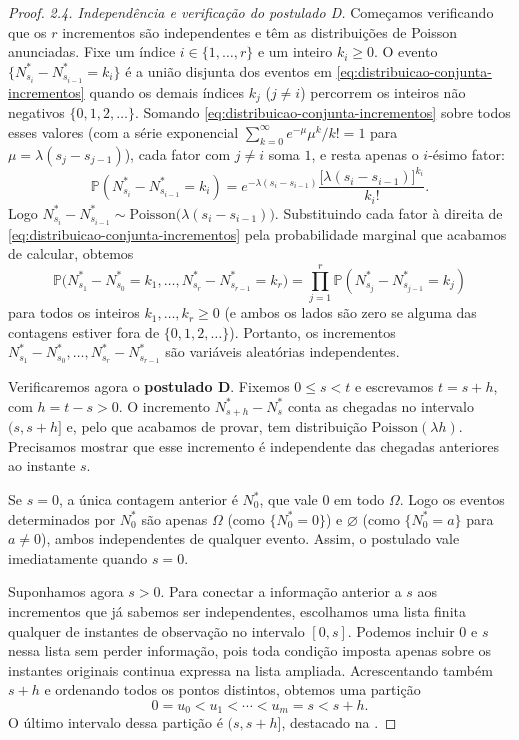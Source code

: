 \documentclass[12pt,portuguese]{article}
\theoremstyle{definition}
\theoremstyle{plainexercise}
\theoremstyle{starredexercise}
\theoremstyle{definition}
\begin{document}
\begin{proof}
\smallskip
\noindent\textit{2.4. Independência e verificação do postulado D.}
Começamos verificando que os $r$ incrementos são independentes e têm as
distribuições de Poisson anunciadas. Fixe um índice $i\in\{1,\ldots,r\}$ e um
inteiro $k_i\geqslant0$. O evento $\{N_{s_i}^*-N_{s_{i-1}}^*=k_i\}$ é a união
disjunta dos eventos em \eqref{eq:distribuicao-conjunta-incrementos} quando os
demais índices $k_j$ ($j\neq i$) percorrem os inteiros não negativos
$\{0,1,2,\ldots\}$. Somando \eqref{eq:distribuicao-conjunta-incrementos} sobre
todos esses valores (com a série exponencial $\sum_{k=0}^\infty e^{-\mu}\mu^k/k!=1$
para $\mu=\lambda(s_j-s_{j-1})$), cada fator com $j\neq i$ soma $1$, e resta
apenas o $i$-ésimo fator:
\[
  \mathbb{P}(N_{s_i}^*-N_{s_{i-1}}^*=k_i)
  =e^{-\lambda(s_i-s_{i-1})}
   \frac{\bigl[\lambda(s_i-s_{i-1})\bigr]^{k_i}}{k_i!}.
\]
Logo $N_{s_i}^*-N_{s_{i-1}}^*\sim\mathrm{Poisson}\bigl(\lambda(s_i-s_{i-1})\bigr)$.
Substituindo cada fator à direita de \eqref{eq:distribuicao-conjunta-incrementos}
pela probabilidade marginal que acabamos de calcular, obtemos
\[
  \mathbb{P}\bigl(N_{s_1}^*-N_{s_0}^*=k_1,\ldots,N_{s_r}^*-N_{s_{r-1}}^*=k_r\bigr)
  =\prod_{j=1}^{r}\mathbb{P}(N_{s_j}^*-N_{s_{j-1}}^*=k_j)
\]
para todos os inteiros $k_1,\ldots,k_r\geqslant0$ (e ambos os lados são zero se
alguma das contagens estiver fora de $\{0,1,2,\ldots\}$). Portanto, os
incrementos $N_{s_1}^*-N_{s_0}^*,\ldots,N_{s_r}^*-N_{s_{r-1}}^*$ são variáveis
aleatórias independentes.

Verificaremos agora o \textbf{postulado D}. Fixemos $0\leqslant s<t$ e
escrevamos $t=s+h$, com $h=t-s>0$. O incremento $N_{s+h}^*-N_s^*$ conta as
chegadas no intervalo $(s,s+h]$ e, pelo que acabamos de provar, tem
distribuição $\mathrm{Poisson}(\lambda h)$. Precisamos mostrar que esse
incremento é independente das chegadas anteriores ao instante $s$.

Se $s=0$, a única contagem anterior é $N_0^*$, que vale $0$ em todo $\Omega$.
Logo os eventos determinados por $N_0^*$ são apenas $\Omega$ (como $\{N_0^*=0\}$)
e $\varnothing$ (como $\{N_0^*=a\}$ para $a\neq0$), ambos independentes de
qualquer evento. Assim, o postulado vale imediatamente quando $s=0$.

Suponhamos agora $s>0$. Para conectar a informação anterior a $s$ aos incrementos
que já sabemos ser independentes, escolhamos uma lista finita qualquer de
instantes de observação no intervalo $[0,s]$. Podemos incluir $0$ e $s$ nessa
lista sem perder informação, pois toda condição imposta apenas sobre os
instantes originais continua expressa na lista ampliada. Acrescentando também
$s+h$ e ordenando todos os pontos distintos, obtemos uma partição
\[
  0=u_0<u_1<\cdots<u_m=s<s+h.
\]
O último intervalo dessa partição é $(s,s+h]$, destacado na
.


\end{proof}
\end{document}
